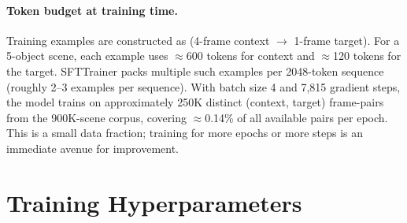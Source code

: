 \documentclass{article}
\begin{document}
\paragraph{Token budget at training time.}
Training examples are constructed as (4-frame context $\to$ 1-frame target).
For a 5-object scene, each example uses $\approx$600 tokens for context and
$\approx$120 tokens for the target. SFTTrainer packs multiple such examples
per 2048-token sequence (roughly 2--3 examples per sequence). With batch size
4 and 7,815 gradient steps, the model trains on approximately 250K distinct
(context, target) frame-pairs from the 900K-scene corpus, covering $\approx$0.14\%
of all available pairs per epoch. This is a small data fraction; training for
more epochs or more steps is an immediate avenue for improvement.

\section{Training Hyperparameters}
\label{app:training}
\end{document}

